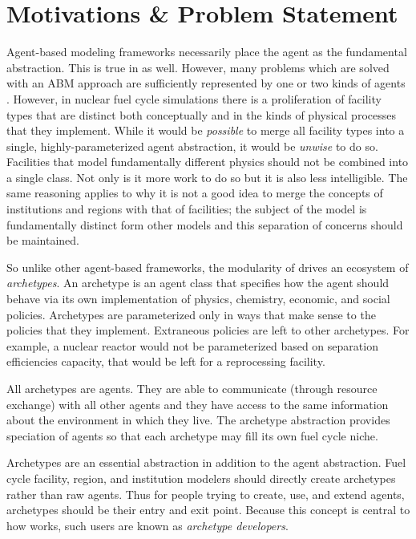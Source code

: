 \section{Motivations \& Problem Statement}
\label{sec-motive}

Agent-based modeling frameworks necessarily place the agent as the fundamental 
abstraction. This is true in \cyclus as well. However, many problems which are 
solved with an \gls{ABM} approach are sufficiently represented by one or two kinds of 
agents \citeme. However, in nuclear fuel cycle simulations there is
a proliferation of facility types that are distinct both conceptually and in the 
kinds of physical processes that they implement. While it would be \emph{possible}
to merge all facility types into a single, highly-parameterized agent abstraction,
it would be \emph{unwise} to do so. Facilities that model fundamentally different
physics should not be combined into a single class. Not only is it more work to 
do so but it is also less intelligible. The same reasoning applies to why it is 
not a good idea to merge the concepts of institutions and regions with that of
facilities; the subject of the model is fundamentally distinct form other models
and this separation of concerns should be maintained.

So unlike other agent-based frameworks, the modularity of \cyclus drives 
an ecosystem of \emph{archetypes}. An archetype is an agent class that specifies 
how the agent should behave via its own implementation of physics, chemistry, 
economic, and social policies. Archetypes are parameterized only in ways that 
make sense to the policies that they implement. Extraneous policies are left to 
other archetypes. For example, a nuclear reactor would not be parameterized based 
on separation efficiencies capacity, that would be left for a reprocessing facility.

All archetypes are agents. They are able to communicate (through resource 
exchange) with all other agents and they have access to the same information 
about the environment in which they live. The archetype abstraction provides
speciation of agents so that each archetype may fill its own fuel cycle niche.

Archetypes are an essential abstraction in addition to the agent abstraction. 
Fuel cycle facility, region, and institution modelers should directly create
archetypes rather than raw agents. Thus for people trying to create, use, and 
extend \cyclus agents, archetypes should be their entry and exit point. Because this 
concept is central to how \cyclus works, such users are known as \emph{archetype
developers}.

